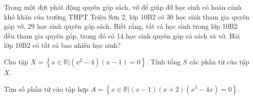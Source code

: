 \begin{bt}%
	Trong một đợt phát động quyên góp sách, vở để giúp đỡ học sinh có hoàn cảnh khó khăn của trường THPT Triệu Sơn 2, lớp 10B2  có 30 học sinh tham gia quyên góp vở, 29 học sinh quyên góp sách. Biết rằng, tất cả học sinh trong lớp 10B2 đều tham gia quyên góp, trong đó có 14 học sinh quyên góp cả sách và vở. Hỏi lớp 10B2 có tất cả bao nhiêu học sinh?
\end{bt}

\begin{bt}%
	Cho tập $ X=\left\{ x\in\mathbb{R}|\left(x^2-4\right)\left(x-1\right)=0\right\}$. Tính tổng  $ S$ các phần tử của tập $ X$.
\end{bt}

\begin{bt}%
	Tìm số phần tử của tập hợp $ A=\left\{ x\in\mathbb{R}\big|  \left(x-1\right)\left(x+2\right)\left(x^3-4x\right)=0\right\}$.
\end{bt}


